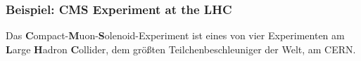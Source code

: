 \documentclass[10pt,t]{beamer}
\begin{document}
\begin{frame}
\frametitle{Beispiel: CMS Experiment at the LHC}
\vspace*{-2.5\baselineskip}
Das \textbf{C}ompact-\textbf{M}uon-\textbf{S}olenoid-Experiment ist eines von vier Experimenten am \textbf{L}arge \textbf{H}adron \textbf{C}ollider, dem größten Teilchenbeschleuniger der Welt, am CERN. \\[\baselineskip]
\vspace*{-18pt}
\end{frame}
\end{document}
